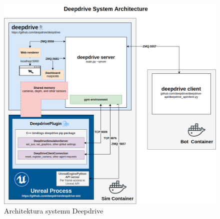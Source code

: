 \begin{figure}[H]
\centering
\includegraphics[width=16cm]{resources/figures/deepdrive-architecture.png}
\caption{Architektura systemu Deepdrive}
\label{DeepdriveArchitecture}
\end{figure}

